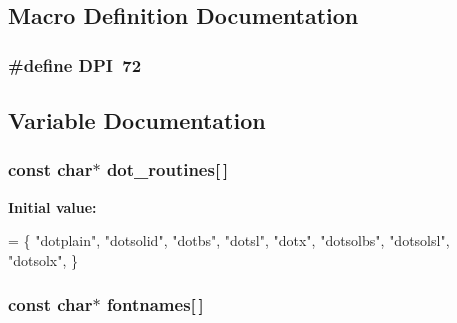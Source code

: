 \subsection{Macro Definition Documentation}
\hypertarget{a00238_a9dcb542bc9dbcae41fdb39a689798698}{
\subsubsection[{D\-P\-I}]{\setlength{\rightskip}{0pt plus 5cm}\#define D\-P\-I~72}}\label{a00238_a9dcb542bc9dbcae41fdb39a689798698}


\subsection{Variable Documentation}
\hypertarget{a00238_ae61faeb1e4eee1b74eb621f84c36769f}{
\subsubsection[{dot\-\_\-routines}]{\setlength{\rightskip}{0pt plus 5cm}const char$\ast$ dot\-\_\-routines\mbox{[}$\,$\mbox{]}\hspace{0.3cm}{\ttfamily [static]}}}\label{a00238_ae61faeb1e4eee1b74eb621f84c36769f}
{\bfseries Initial value\-:}
\begin{DoxyCode}
=
\{
    \textcolor{stringliteral}{"dotplain"},
    \textcolor{stringliteral}{"dotsolid"},
    \textcolor{stringliteral}{"dotbs"},
    \textcolor{stringliteral}{"dotsl"},
    \textcolor{stringliteral}{"dotx"},
    \textcolor{stringliteral}{"dotsolbs"},
    \textcolor{stringliteral}{"dotsolsl"},
    \textcolor{stringliteral}{"dotsolx"},
\}
\end{DoxyCode}
\hypertarget{a00238_a6a8f9c932a4206dfed73898572cdcbca}{
\subsubsection[{fontnames}]{\setlength{\rightskip}{0pt plus 5cm}const char$\ast$ fontnames\mbox{[}$\,$\mbox{]}\hspace{0.3cm}{\ttfamily [static]}}}\label{a00238_a6a8f9c932a4206dfed73898572cdcbca}
